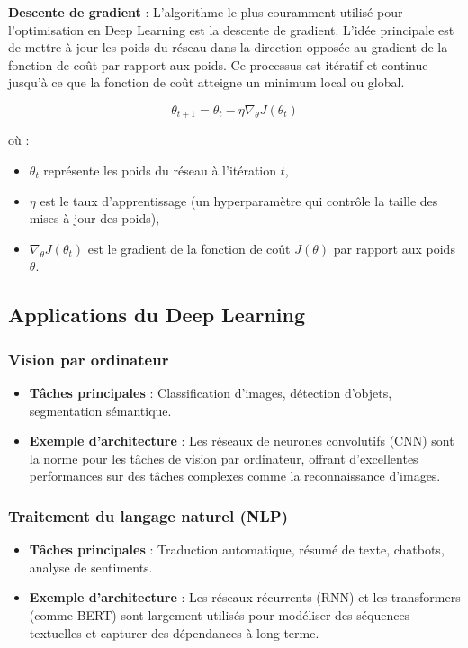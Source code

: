  \textbf{Descente de gradient} :
	L'algorithme le plus couramment utilisé pour l'optimisation en Deep Learning est la descente de gradient. L'idée principale est de mettre à jour les poids du réseau dans la direction opposée au gradient de la fonction de coût par rapport aux poids. Ce processus est itératif et continue jusqu'à ce que la fonction de coût atteigne un minimum local ou global.
	
	\[
	\theta_{t+1} = \theta_t - \eta \nabla_{\theta} J(\theta_t)
	\]
	
	où :
	\begin{itemize}
		\item \( \theta_t \) représente les poids du réseau à l'itération \( t \),
		\item \( \eta \) est le taux d'apprentissage (un hyperparamètre qui contrôle la taille des mises à jour des poids),
		\item \( \nabla_{\theta} J(\theta_t) \) est le gradient de la fonction de coût \( J(\theta) \) par rapport aux poids \( \theta \).
	\end{itemize}

\subsection{Applications du Deep Learning}

\subsubsection*{Vision par ordinateur}

\begin{itemize}
	\item \textbf{Tâches principales} : Classification d'images, détection d'objets, segmentation sémantique.
	\item \textbf{Exemple d'architecture} : Les réseaux de neurones convolutifs (CNN) sont la norme pour les tâches de vision par ordinateur, offrant d'excellentes performances sur des tâches complexes comme la reconnaissance d'images.
\end{itemize}

\subsubsection*{Traitement du langage naturel (NLP)}

\begin{itemize}
	\item \textbf{Tâches principales} : Traduction automatique, résumé de texte, chatbots, analyse de sentiments.
	\item \textbf{Exemple d'architecture} : Les réseaux récurrents (RNN) et les transformers (comme BERT) sont largement utilisés pour modéliser des séquences textuelles et capturer des dépendances à long terme.
\end{itemize}

